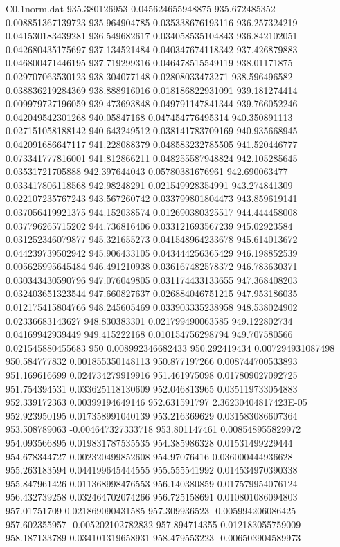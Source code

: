 \begin{filecontents}{C0.1norm.dat}
935.380126953		0.045624655948875
935.672485352		0.008851367139723
935.964904785		0.035338676193116
936.257324219		0.041530183439281
936.549682617		0.034058535104843
936.842102051		0.042680435175697
937.134521484		0.040347674118342
937.426879883		0.046800471446195
937.719299316		0.046478515549119
938.01171875		0.029707063530123
938.304077148		0.02808033473271
938.596496582		0.038836219284369
938.888916016		0.018186822931091
939.181274414		0.009979727196059
939.473693848		0.049791147841344
939.766052246		0.042049542301268
940.05847168		0.047454776495314
940.350891113		0.027151058188142
940.643249512		0.038141783709169
940.935668945		0.042091686647117
941.228088379		0.048583232785505
941.520446777		0.073341777816001
941.812866211		0.048255587948824
942.105285645		0.03531721705888
942.397644043		0.05780381676961
942.690063477		0.033417806118568
942.98248291		0.021549928354991
943.274841309		0.022107235767243
943.567260742		0.033799801804473
943.859619141		0.037056419921375
944.152038574		0.012690380325517
944.444458008		0.037796265715202
944.736816406		0.033121693567239
945.02923584		0.031252346079877
945.321655273		0.041548964233678
945.614013672		0.044239739502942
945.906433105		0.043444256365429
946.198852539		0.005625995645484
946.491210938		0.036167482578372
946.783630371		0.030343430590796
947.076049805		0.031174433133655
947.368408203		0.032403651323544
947.660827637		0.026884046751215
947.953186035		0.012175415804766
948.245605469		0.033903335238958
948.538024902		0.02336683143627
948.830383301		0.021799490063585
949.122802734		0.04169942939449
949.415222168		0.010154756298794
949.707580566		0.021545880455683
950		0.008992346682433
950.292419434		0.007294931087498
950.584777832		0.001855350148113
950.877197266		0.008744700533893
951.169616699		0.024734279919916
951.461975098		0.017809027092725
951.754394531		0.033625118130609
952.046813965		0.035119733054883
952.339172363		0.00399194649146
952.631591797		2.36230404817423E-05
952.923950195		0.017358991040139
953.216369629		0.031583086607364
953.508789063		-0.004647327333718
953.801147461		0.008548955829972
954.093566895		0.019831787535535
954.385986328		0.01531499229444
954.678344727		0.002320499852608
954.97076416		0.036000444936628
955.263183594		0.044199645444555
955.555541992		0.014534970390338
955.847961426		0.011368998476553
956.140380859		0.017579954076124
956.432739258		0.032464702074266
956.725158691		0.010801086094803
957.01751709		0.021869090431585
957.309936523		-0.005994206086425
957.602355957		-0.005202102782832
957.894714355		0.012183055759009
958.187133789		0.034101319658931
958.479553223		-0.006503904589973

\end{filecontents}

